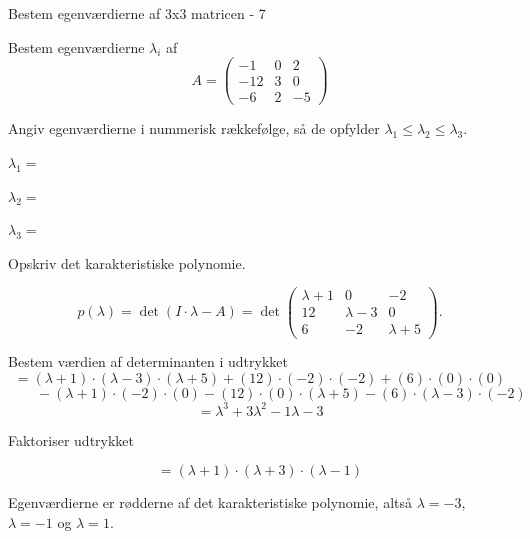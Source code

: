 \documentclass{article}
\begin{document}
\begin{exercise}{Bestem egenværdierne af 3x3 matricen - 7}

Bestem egenværdierne $\lambda_i$ af
\[
A=\begin{pmatrix}
-1 & 0 & 2 \\
-12 & 3 & 0 \\
-6 & 2 & -5
\end{pmatrix}
\]

Angiv egenværdierne i nummerisk rækkefølge, så de
opfylder $\lambda_1 \le \lambda_2 \le \lambda_3$.

$\lambda_1 = $ 

$\lambda_2 = $ 

$\lambda_3 = $ 

\hint
Opskriv det karakteristiske polynomie.

\hint
\[
p(\lambda)=\det\left(I \cdot \lambda - A \right)=\det\begin{pmatrix}
\lambda + 1 & 0 & -2 \\
12 & \lambda - 3 & 0 \\
6 & -2 & \lambda + 5
\end{pmatrix}.
\]

\hint
Bestem værdien af determinanten i udtrykket
\[
=(\lambda + 1) \cdot (\lambda - 3) \cdot (\lambda + 5)+(12) \cdot (-2) \cdot (-2)+(6) \cdot (0) \cdot (0)
\]
\[
\qquad -(\lambda + 1) \cdot (-2) \cdot (0)-(12) \cdot (0) \cdot (\lambda + 5)-(6) \cdot (\lambda - 3) \cdot (-2)
\]
\[
=\lambda^3 + 3\lambda^2 - 1\lambda - 3
\]

\hint
Faktoriser udtrykket

\hint
\[
=(\lambda + 1) \cdot (\lambda + 3) \cdot (\lambda - 1)
\]

\hint
Egenværdierne er rødderne af det karakteristiske polynomie,
altså
$\lambda=-3$, $\lambda=-1$ og $\lambda=1$.

\end{exercise}
\end{document}
